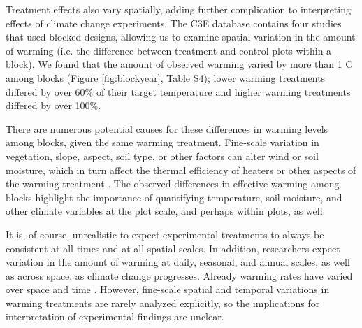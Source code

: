\documentclass{article}
\begin{document}
\par Treatment effects also vary spatially, adding further complication to interpreting effects of climate change experiments. The C3E database contains four studies that used blocked designs, allowing us to examine spatial variation in the amount of warming (i.e. the difference between treatment and control plots within a block). We found that the amount of observed warming varied by more than 1 \degree C among blocks (Figure \ref{fig:blockyear}, Table S4); lower warming treatments differed by over 60\% of their target temperature and higher warming treatments differed by over 100\%. 
\par There are numerous potential causes for these differences in warming levels among blocks, given the same warming treatment. Fine-scale variation in vegetation, slope, aspect, soil type, or other factors can alter wind or soil moisture, which in turn affect the thermal efficiency of heaters or other aspects of the warming treatment \citep{peterjohn1993,kimball2005,kimball2008,hoeppner2012,rollinson2015}. The observed differences in effective warming among blocks highlight the importance of quantifying temperature, soil moisture, and other climate variables at the plot scale, and perhaps within plots, as well. 

\par It is, of course, unrealistic to expect experimental treatments to always be consistent at all times and at all spatial scales. In addition, researchers expect variation in the amount of warming at daily, seasonal, and annual scales, as well as across space, as climate change progresses. Already warming rates have varied over space and time \citep{ipcc2013}. However, fine-scale spatial and temporal variations in warming treatments are rarely analyzed explicitly, so the implications for interpretation of experimental findings are unclear. %
\end{document}
